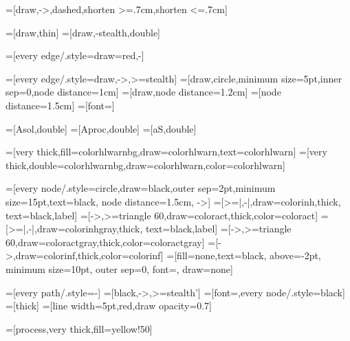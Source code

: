 =[draw,->,dashed,shorten >=.7cm,shorten <=.7cm]

=[draw,thin]%
=[draw,-stealth,double]

=[every edge/.style={draw=red,-}]

=[every edge/.style={draw,->,>=stealth}]
=[draw,circle,minimum size=5pt,inner sep=0,node distance=1cm]
=[draw,node distance=1.2cm]
=[node distance=1.5cm]
=[font=\Large]

=[Asol,double]
=[Aproc,double]
=[aS,double]

=[very thick,fill=colorhlwarnbg,draw=colorhlwarn,text=colorhlwarn]
=[very thick,double=colorhlwarnbg,draw=colorhlwarn,color=colorhlwarn]








=[every node/.style={circle,draw=black,outer sep=2pt,minimum
                size=15pt,text=black}, node distance=1.5cm, ->]
=[>=|,-|,draw=colorinh,thick, text=black,label]
=[->,>=triangle 60,draw=coloract,thick,color=coloract]
=[>=|,-|,draw=colorinhgray,thick, text=black,label]
=[->,>=triangle 60,draw=coloractgray,thick,color=coloractgray]
=[->,draw=colorinf,thick,color=colorinf]
=[fill=none,text=black, above=-2pt,%
minimum size=10pt, outer sep=0, font=\scriptsize, draw=none]


=[every path/.style={-}]
=[black,->,>=stealth']
=[font=\scriptsize,every node/.style={black}]
=[thick]
=[line width=5pt,red,draw opacity=0.7]


=[process,very thick,fill=yellow!50]

